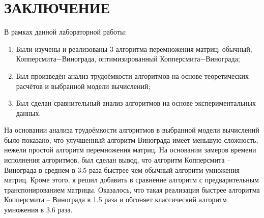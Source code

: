 \chapter*{ЗАКЛЮЧЕНИЕ}

В рамках данной лабораторной работы:

\begin{enumerate}
    \item Были изучены и реализованы 3 алгоритма перемножения матриц: обычный, Копперсмита$-$Винограда, оптимизированный Копперсмита$-$Винограда;
    \item Был произведён анализ трудоёмкости алгоритмов на основе теоретических расчётов и выбранной модели вычислений;
    \item Был сделан сравнительный анализ алгоритмов на основе экспериментальных данных.
\end{enumerate}

На основании анализа трудоёмкости алгоритмов в выбранной модели вычислений было показано, что улучшенный алгоритм Винограда имеет меньшую сложность, нежели простой алгоритм перемножения матриц. На основании замеров времени исполнения алгоритмов, был сделан вывод, что алгоритм Копперсмита -- Винограда в среднем в 3.5 раза быстрее чем обычный алгоритм умножения матриц. Кроме этого, я решил добавить в сравнение алгоритм с предварительным транспонированием матрицы. Оказалось, что такая реализация быстрее алгоритма Копперсмита -- Винограда в 1.5 раза и обгоняет классический алгоритм умножения в 3.6 раза.
